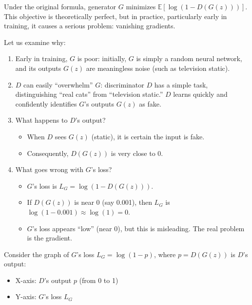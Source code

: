 Under the original formula, generator \(G\) minimizes \(\mathbb{E}[\log(1-D(G(z)))]\). This objective is theoretically perfect, but in practice, particularly early in training, it causes a serious problem: vanishing gradients.

Let us examine why:

\begin{enumerate}
\def\labelenumi{\arabic{enumi}.}
\tightlist
\item
  Early in training, \(G\) is poor: initially, \(G\) is simply a random neural network, and its outputs \(G(z)\) are meaningless noise (such as television static).
\item
  \(D\) can easily ``overwhelm'' \(G\): discriminator \(D\) has a simple task, distinguishing ``real cats'' from ``television static.'' \(D\) learns quickly and confidently identifies \(G\)'s outputs \(G(z)\) as fake.
\item
  What happens to \(D\)'s output?

  \begin{itemize}
  \tightlist
  \item
    When \(D\) sees \(G(z)\) (static), it is certain the input is fake.
  \item
    Consequently, \(D(G(z))\) is very close to 0.
  \end{itemize}
\item
  What goes wrong with \(G\)'s loss?

  \begin{itemize}
  \tightlist
  \item
    \(G\)'s loss is \(L_G=\log(1-D(G(z)))\).
  \item
    If \(D(G(z))\) is near 0 (say 0.001), then \(L_G\) is \(\log(1-0.001)\approx \log(1)=0\).
  \item
    \(G\)'s loss appears ``low'' (near 0), but this is misleading. The real problem is the gradient.
  \end{itemize}
\end{enumerate}

Consider the graph of \(G\)'s loss \(L_G=\log(1-p)\), where \(p=D(G(z))\) is \(D\)'s output:

\begin{itemize}
\tightlist
\item
  X-axis: \(D\)'s output \(p\) (from 0 to 1)
\item
  Y-axis: \(G\)'s loss \(L_G\)
\end{itemize}

